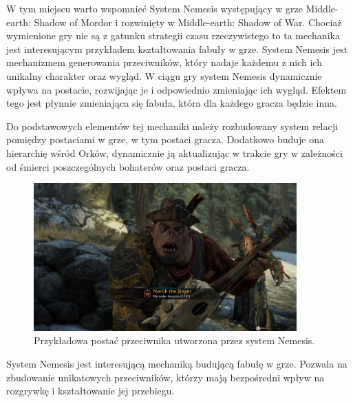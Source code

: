 W tym miejscu warto wspomnieć System Nemesis występujący w grze Middle-earth: Shadow of Mordor i rozwinięty w
Middle-earth: Shadow of War. Chociaż wymienione gry nie są z gatunku strategii czasu rzeczywistego to ta mechanika jest
interesującym przykładem kształtowania fabuły w grze. System Nemesis jest mechanizmem generowania przeciwników, który nadaje
każdemu z nich ich unikalny charakter oraz wygląd. W ciągu gry system Nemesis dynamicznie wpływa na postacie, rozwijając
je i odpowiednio zmieniając ich wygląd. Efektem tego jest płynnie zmieniająca się fabuła, która dla każdego gracza
będzie inna.

Do podstawowych elementów tej mechaniki należy rozbudowany system relacji pomiędzy postaciami w grze, w tym postaci
gracza. Dodatkowo buduje ona hierarchię wśród Orków, dynamicznie ją aktualizując w trakcie gry w zależności od śmierci
poszczególnych bohaterów oraz postaci gracza.

\begin{figure}[h!]
    \centering
    \includegraphics[width=0.9\textwidth]{images/system_nemesis.jpg}
    \caption{Przykładowa postać przeciwnika utworzona przez system Nemesis.}
\end{figure}

System Nemesis jest interesującą mechaniką budującą fabułę w grze. Pozwala na zbudowanie unikatowych przeciwników,
którzy mają bezpośredni wpływ na rozgrywkę i kształtowanie jej przebiegu.